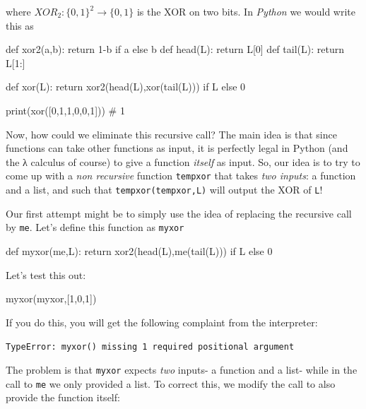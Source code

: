 where \(\ensuremath{\mathit{XOR}}_2:\{0,1\}^2 \rightarrow \{0,1\}\) is
the XOR on two bits. In \emph{Python} we would write this as

\begin{code}
def xor2(a,b): return 1-b if a else b
def head(L): return L[0]
def tail(L): return L[1:]

def xor(L): return xor2(head(L),xor(tail(L))) if L else 0

print(xor([0,1,1,0,0,1]))
# 1
\end{code}

Now, how could we eliminate this recursive call? The main idea is that
since functions can take other functions as input, it is perfectly legal
in Python (and the λ calculus of course) to give a function
\emph{itself} as input. So, our idea is to try to come up with a
\emph{non recursive} function \texttt{tempxor} that takes \emph{two
inputs}: a function and a list, and such that
\texttt{tempxor(tempxor,L)} will output the XOR of \texttt{L}!


Our first attempt might be to simply use the idea of replacing the
recursive call by \texttt{me}. Let's define this function as
\texttt{myxor}

\begin{code}
def myxor(me,L): return xor2(head(L),me(tail(L))) if L else 0
\end{code}

Let's test this out:

\begin{code}
myxor(myxor,[1,0,1])
\end{code}

If you do this, you will get the following complaint from the
interpreter:

\texttt{TypeError: myxor() missing 1 required positional argument}

The problem is that \texttt{myxor} expects \emph{two} inputs- a function
and a list- while in the call to \texttt{me} we only provided a list. To
correct this, we modify the call to also provide the function itself:

